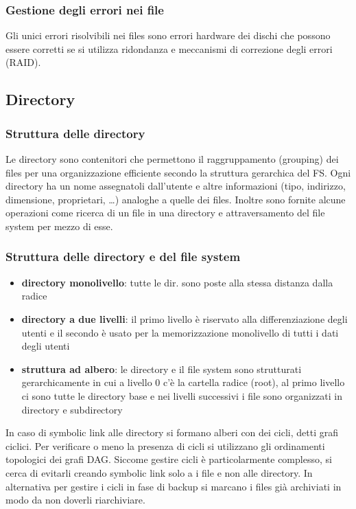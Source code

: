 \documentclass[a4paper]{article}
\begin{document}
\subsubsection*{Gestione degli errori nei file}
Gli unici errori risolvibili nei files sono errori hardware dei dischi che possono essere corretti se si utilizza ridondanza e
meccanismi di correzione degli errori (RAID).


\subsection{Directory}
\subsubsection*{Struttura delle directory}
Le directory sono contenitori che permettono il raggruppamento (grouping) dei files per una organizzazione efficiente secondo
la struttura gerarchica del FS. Ogni directory ha un nome assegnatoli dall'utente e altre informazioni (tipo, indirizzo,
dimensione, proprietari, \dots) analoghe a quelle dei files. Inoltre sono fornite alcune operazioni come ricerca di un file
in una directory e attraversamento del file system per mezzo di esse.

\subsubsection*{Struttura delle directory e del file system}
\begin{itemize}
	\item \textbf{directory monolivello}: tutte le dir. sono poste alla stessa distanza dalla radice
	\item \textbf{directory a due livelli}: il primo livello è riservato alla differenziazione degli utenti e il secondo è usato
	per la memorizzazione monolivello di tutti i dati degli utenti
	\item \textbf{struttura ad albero}: le directory e il file system sono strutturati gerarchicamente in cui a livello 0 c'è
	la cartella radice (root), al primo livello ci sono tutte le directory base e nei livelli successivi i file sono organizzati
	in directory e subdirectory
\end{itemize}
In caso di symbolic link alle directory si formano alberi con dei cicli, detti grafi ciclici. Per verificare o meno la presenza
di cicli si utilizzano gli ordinamenti topologici dei grafi DAG. Siccome gestire cicli è particolarmente complesso, si cerca di
evitarli creando symbolic link solo a i file e non alle directory. In alternativa per gestire i cicli in fase di backup si
marcano i files già archiviati in modo da non doverli riarchiviare.
\end{document}
